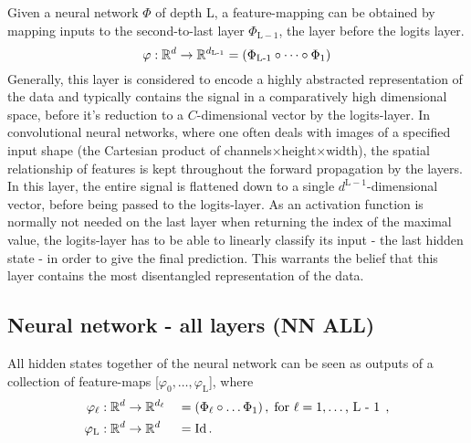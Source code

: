 Given a neural network $\Phi$ of depth L,
a feature-mapping can be obtained by mapping inputs to the second-to-last layer $\Phi_{\text{L}-1}$, 
the layer before the logits layer.
\[
    \varphi : \mathbb{R}^d \to \mathbb{R}^{d_\textnormal{L-1}} = (\Phi_\textnormal{L-1} \circ \dots \circ \Phi_1)
\]
Generally, this layer is considered to encode a highly abstracted representation of the data
and typically contains the signal in a comparatively high dimensional space, before it's
reduction to a $C$-dimensional vector by the logits-layer.
In convolutional neural networks, where one often deals with images
of a specified input shape (the Cartesian product of channels$\times$height$\times$width), 
the spatial relationship of features is kept throughout the forward propagation by the layers.
In this layer, the entire signal is flattened down to a single $d^{\text{L}-1}$-dimensional vector, 
before being passed to the logits-layer.
As an activation function is normally not needed on the last layer when returning the index of the maximal value, 
the logits-layer has to be able to linearly classify its input - the last hidden state - in order to 
give the final prediction.
This warrants the belief that this layer contains the most disentangled representation of the data.


\subsection{Neural network - all layers (NN ALL)}

All hidden states together of the neural network can be seen as outputs of a collection of feature-maps [$\varphi_0, \dots, \varphi_\text{L}$], where
\begin{alignat*}{2}
    \varphi_\ell &: \mathbb{R}^d \to \mathbb{R}^{d_\ell} &&= (\Phi_\ell \circ \dots \Phi_1)
    \,, \; \text{for $\ell = 1, \dots$, L - 1} \;  \,, \\
    \varphi_\textnormal{L} &: \mathbb{R}^d \to \mathbb{R}^d &&= \textnormal{Id} \,.
\end{alignat*}





